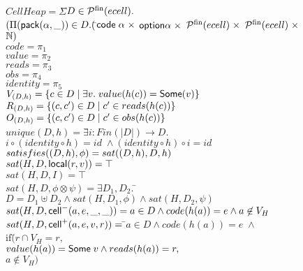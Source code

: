 \begin{figure}

\begin{tabbing}
$CellHeap = \Sigma$\=$ D \in \mathcal{P}^{\mathrm{fin}}(ecell).$ \\
               \>$(\Pi (\mathsf{pack}({\alpha}, {\_})) \in D. ($\=${\mathsf{code}\;{\alpha}} \;\times$
                                         ${\mathsf{option }{\alpha}} \;\times$ 
                                         ${\mathcal{P}^{\mathrm{fin}}(ecell)} \;\times$ 
                                         ${\mathcal{P}^{\mathrm{fin}}(ecell)} \;\times$ 
                                         $\mathbb{N})$ \\[1em]
       

$code = \pi_1$ \\
$value = \pi_2$ \\
$reads = \pi_3$ \\
$obs = \pi_4$ \\
$identity = \pi_5$ \\[1em]

$V_{(D, h)} = \{{{c \in D}\;|\;{\exists v.\; value(h(c)) = \mathsf{Some}(v)}}\}$ \\
$R_{(D, h)} = \{{{(c,c') \in D}\;|\;{ c' \in reads(h(c)) }}\}$ \\
$O_{(D, h)} = \{{{(c,c') \in D}\;|\;{ c' \in obs(h(c)) }}\}$ \\[1em]

$unique(D,h) = \exists$\=$i : Fin(|D|) \to D.$\\
                       \>$i \circ (identity \circ h) = id \; \land (identity \circ h) \circ i = id$ \\[1em]

$satisfies({(D,h)}, {\phi}) = sat((D,h), D, h)$ \\[1em]

$sat(H, D, \mathsf{local}({r}, {v})) = \top$ \\
$sat(H, D, I) = \top$ \\
$sat(H, D, \phi \otimes \psi) = \exists D_1, D_2.\;$\=$D = D_1 \uplus D_2 
                                                      \land sat(H, D_1, \phi) 
                                                      \land sat(H, D_2, \psi)$ \\
$sat(H, D, \mathsf{cell}^{-}({a}, {e}, {\_}, {\_})) = a \in D \land code(h(a)) = e \land a \not \in V_H$ \\
$sat(H, D, \mathsf{cell}^{+}({a}, {e}, {v}, {r})) =\; $\=$ a \in D \land code(h(a)) = e \;\land$ \\
      \>$\mathrm{if}($\=$r \cap V_H = r,$ \\
      \>     \>$value(h(a)) = \mathsf{Some}\;v \land reads(h(a)) = r,$ \\
      \>     \>$a \not\in V_H)$\\[1em]
 


\end{tabbing}
\end{figure}
